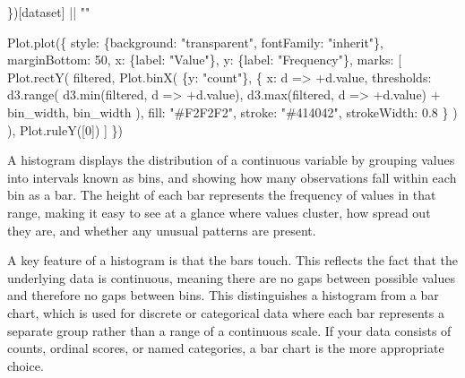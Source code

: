 \documentclass[
  letterpaper,
  DIV=11,
  numbers=noendperiod]{scrartcl}
\newenvironment{Shaded}{\begin{snugshade}}{\end{snugshade}}
\newcommand{\NormalTok}[1]{\textcolor[rgb]{0.00,0.23,0.31}{#1}}
\begin{document}
\begin{Shaded}
\begin{Highlighting}[]
\NormalTok{\})[dataset] || ""}

\NormalTok{Plot.plot(\{}
\NormalTok{  style: \{background: "transparent", fontFamily: "inherit"\},}
\NormalTok{  marginBottom: 50,}
\NormalTok{  x: \{label: "Value"\},}
\NormalTok{  y: \{label: "Frequency"\},}
\NormalTok{  marks: [}
\NormalTok{    Plot.rectY(}
\NormalTok{      filtered,}
\NormalTok{      Plot.binX(}
\NormalTok{        \{y: "count"\},}
\NormalTok{        \{}
\NormalTok{          x: d =\textgreater{} +d.value,}
\NormalTok{          thresholds: d3.range(}
\NormalTok{            d3.min(filtered, d =\textgreater{} +d.value),}
\NormalTok{            d3.max(filtered, d =\textgreater{} +d.value) + bin\_width,}
\NormalTok{            bin\_width}
\NormalTok{          ),}
\NormalTok{          fill: "\#F2F2F2",}
\NormalTok{          stroke: "\#414042",}
\NormalTok{          strokeWidth: 0.8}
\NormalTok{        \}}
\NormalTok{      )}
\NormalTok{    ),}
\NormalTok{    Plot.ruleY([0])}
\NormalTok{  ]}
\NormalTok{\})}
\end{Highlighting}
\end{Shaded}

\begin{Shaded}
\end{Shaded}

A histogram displays the distribution of a continuous variable by
grouping values into intervals known as bins, and showing how many
observations fall within each bin as a bar. The height of each bar
represents the frequency of values in that range, making it easy to see
at a glance where values cluster, how spread out they are, and whether
any unusual patterns are present.

A key feature of a histogram is that the bars touch. This reflects the
fact that the underlying data is continuous, meaning there are no gaps
between possible values and therefore no gaps between bins. This
distinguishes a histogram from a bar chart, which is used for discrete
or categorical data where each bar represents a separate group rather
than a range of a continuous scale. If your data consists of counts,
ordinal scores, or named categories, a bar chart is the more appropriate
choice.
\end{document}
